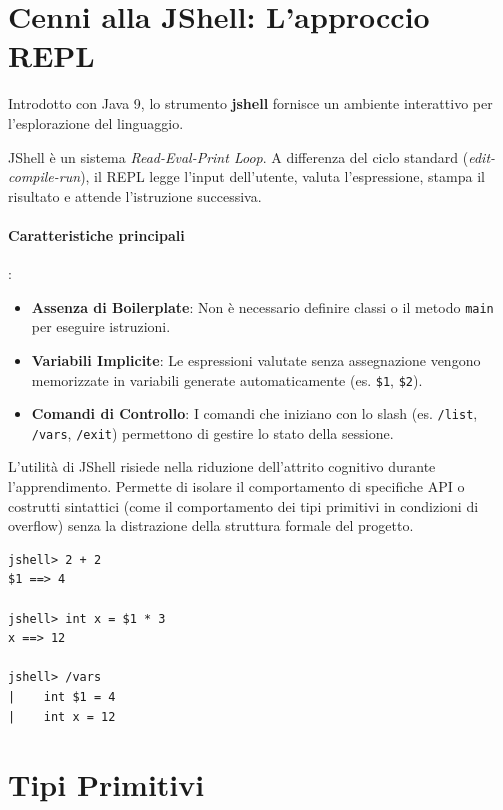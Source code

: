 \section{Cenni alla JShell: L'approccio REPL}

Introdotto con Java 9, lo strumento \textbf{jshell} fornisce un ambiente interattivo per l'esplorazione del linguaggio.

JShell è un sistema \textit{Read-Eval-Print Loop}. A differenza del ciclo standard (\textit{edit-compile-run}), il REPL legge l'input dell'utente, valuta l'espressione, stampa il risultato e attende l'istruzione successiva.

\paragraph{Caratteristiche principali}:
\begin{itemize}
    \item \textbf{Assenza di Boilerplate}: Non è necessario definire classi o il metodo \texttt{main} per eseguire istruzioni.
    \item \textbf{Variabili Implicite}: Le espressioni valutate senza assegnazione vengono memorizzate in variabili generate automaticamente (es. \texttt{\$1}, \texttt{\$2}).
    \item \textbf{Comandi di Controllo}: I comandi che iniziano con lo slash (es. \texttt{/list}, \texttt{/vars}, \texttt{/exit}) permettono di gestire lo stato della sessione.
\end{itemize}

\begin{observation}
L'utilità di JShell risiede nella riduzione dell'attrito cognitivo durante l'apprendimento. Permette di isolare il comportamento di specifiche API o costrutti sintattici (come il comportamento dei tipi primitivi in condizioni di overflow) senza la distrazione della struttura formale del progetto.
\end{observation}

\begin{lstlisting}[caption={Esempio di sessione interattiva}]
jshell> 2 + 2
$1 ==> 4

jshell> int x = $1 * 3
x ==> 12

jshell> /vars
|    int $1 = 4
|    int x = 12
\end{lstlisting}

\section{Tipi Primitivi}

